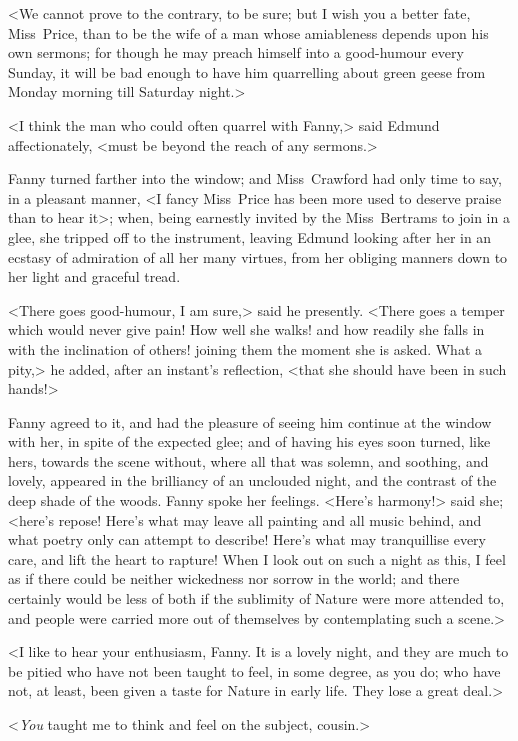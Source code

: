 <We cannot prove to the contrary, to be sure; but I wish you a better fate, Miss~Price, than to be the wife of a man whose amiableness depends upon his own sermons; for though he may preach himself into a good-humour every Sunday, it will be bad enough to have him quarrelling about green geese from Monday morning till Saturday night.>

<I think the man who could often quarrel with Fanny,> said Edmund affectionately, <must be beyond the reach of any sermons.>

Fanny turned farther into the window; and Miss~Crawford had only time to say, in a pleasant manner, <I fancy Miss~Price has been more used to deserve praise than to hear it>; when, being earnestly invited by the Miss~Bertrams to join in a glee, she tripped off to the instrument, leaving Edmund looking after her in an ecstasy of admiration of all her many virtues, from her obliging manners down to her light and graceful tread.

<There goes good-humour, I am sure,> said he presently. <There goes a temper which would never give pain! How well she walks! and how readily she falls in with the inclination of others! joining them the moment she is asked. What a pity,> he added, after an instant's reflection, <that she should have been in such hands!>

Fanny agreed to it, and had the pleasure of seeing him continue at the window with her, in spite of the expected glee; and of having his eyes soon turned, like hers, towards the scene without, where all that was solemn, and soothing, and lovely, appeared in the brilliancy of an unclouded night, and the contrast of the deep shade of the woods. Fanny spoke her feelings. <Here's harmony!> said she; <here's repose! Here's what may leave all painting and all music behind, and what poetry only can attempt to describe! Here's what may tranquillise every care, and lift the heart to rapture! When I look out on such a night as this, I feel as if there could be neither wickedness nor sorrow in the world; and there certainly would be less of both if the sublimity of Nature were more attended to, and people were carried more out of themselves by contemplating such a scene.>

<I like to hear your enthusiasm, Fanny. It is a lovely night, and they are much to be pitied who have not been taught to feel, in some degree, as you do; who have not, at least, been given a taste for Nature in early life. They lose a great deal.>

<\textit{You}  taught me to think and feel on the subject, cousin.>

